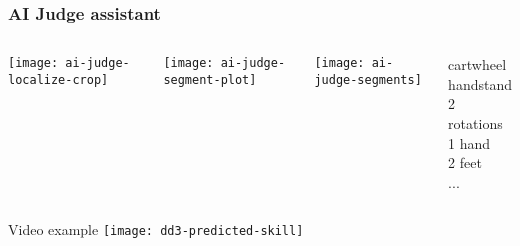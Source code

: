 \documentclass[aspectratio=169]{beamer}
\begin{document}
\begin{frame}
  \frametitle{AI Judge assistant}

  \begin{columns}[c]
  \end{columns}

  \begin{columns}[c]
  
    \begin{center}
      \texttt{[image: ai-judge-localize-crop]}
    \end{center}
    
    \begin{center}
      \texttt{[image: ai-judge-segment-plot]}
    \end{center}
    \begin{center}
      \texttt{[image: ai-judge-segments]}
    \end{center}

    
    \begin{center}
        cartwheel \\
        handstand \\
        2 rotations \\
        1 hand \\
        2 feet \\
        ... 
    \end{center}
      
  \end{columns}


\end{frame}

\begin{frame}{Video example}
  \texttt{[image: dd3-predicted-skill]} 
  
  \href{run:dd3-annotated.mp4}{}

\end{frame}
\end{document}
